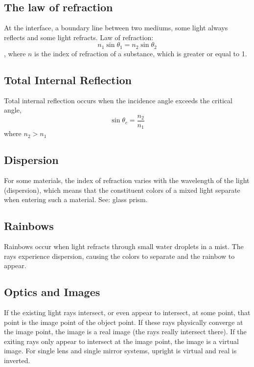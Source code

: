 \documentclass[twocolumn]{article}
\begin{document}
\subsection{The law of refraction}
\begin{outline}
\1 At the interface, a boundary line between two mediums, some light always reflects and some light refracts. 
\1 Law of refraction: \[n_1\sin\theta_1=n_2\sin\theta_2\], where $n$ is the index of refraction of a substance, which is greater or equal to 1. 
\end{outline}
\subsection{Total Internal Reflection}
\begin{outline}
\1 Total internal reflection occurs when the incidence angle exceeds the critical angle, \[\sin\theta_c=\dfrac{n_2}{n_1}\] where \(n_2>n_1\)
\end{outline}
\subsection{Dispersion}
\begin{outline}
\1 For some materials, the index of refraction varies with the wavelength of the light (dispersion), which means that the constituent colors of a mixed light separate when entering such a material. See: glass prism. 

\end{outline}
\subsection{Rainbows}
\begin{outline}
\1 Rainbows occur when light refracts through small water droplets in a mist. The rays experience dispersion, causing the colors to separate and the rainbow to appear. 

\end{outline}
\subsection{Optics and Images}
\begin{outline}
\1 If the existing light rays intersect, or even appear to intersect, at some point, that point is the image point of the object point. If these rays physically converge at the image point, the image is a real image (the rays really intersect there). If the exiting rays only appear to intersect at the image point, the image is a virtual image. 
    \2 For single lens and single mirror systems, upright is virtual and real is inverted. 

\end{outline}
\end{document}

